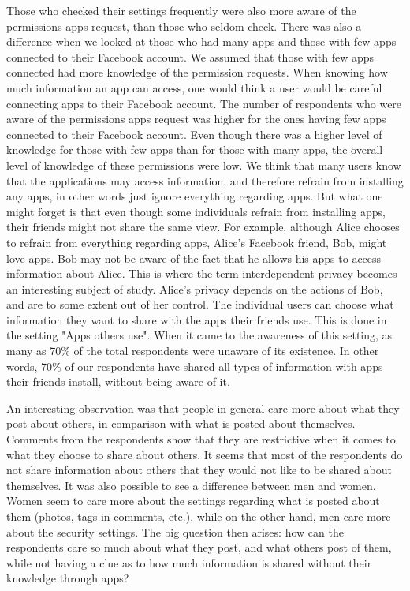 Those who checked their settings frequently were also more aware of the permissions apps request, than those who seldom check. There was also a difference when we looked at those who had many apps and those with few apps connected to their Facebook account. We assumed that those with few apps connected had more knowledge of the permission requests. When knowing how much information an app can access, one would think a user would be careful connecting apps to their Facebook account. The number of respondents who were aware of the permissions apps request was higher for the ones having few apps connected to their Facebook account. Even though there was a higher level of knowledge for those with few apps than for those with many apps, the overall level of knowledge of these permissions were low. We think that many users know that the applications may access information, and therefore refrain from installing any apps, in other words just ignore everything regarding apps. But what one might forget is that even though some individuals refrain from installing apps, their friends might not share the same view. For example, although Alice chooses to refrain from everything regarding apps, Alice's Facebook friend, Bob, might love apps. Bob may not be aware of the fact that he allows his apps to access information about Alice. This is where the term interdependent privacy becomes an interesting subject of study. Alice's privacy depends on the actions of Bob, and are to some extent out of her control. The individual users can choose what information they want to share with the apps their friends use. This is done in the setting "Apps others use". When it came to the awareness of this setting, as many as 70\% of the total respondents were unaware of its existence. In other words, 70\% of our respondents have shared all types of information with apps their friends install, without being aware of it.

An interesting observation was that people in general care more about what they post about others, in comparison with what is posted about themselves. Comments from the respondents show that they are restrictive when it comes to what they choose to share about others. It seems that most of the respondents do not share information about others that they would not like to be shared about themselves. It was also possible to see a difference between men and women. Women seem to care more about the settings regarding what is posted about them (photos, tags in comments, etc.), while on the other hand, men care more about the security settings. The big question then arises: how can the respondents care so much about what they post, and what others post of them, while not having a clue as to how much information is shared without their knowledge through apps? 

